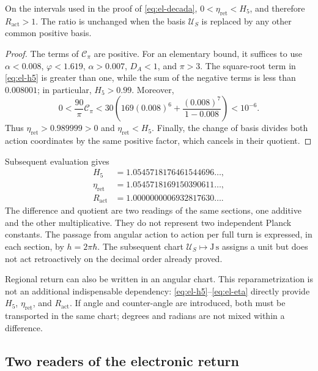 \begin{proposition}
On the intervals used in the proof of \eqref{eq:el-decada},
\(0<\eta_{\mathrm{ret}}<H_5\), and therefore
\(R_{\mathrm{act}}>1\). The ratio is unchanged when the basis
\(\mathcal U_S\) is replaced by any other common positive basis.
\end{proposition}
\begin{proof}
The terms of \(\mathcal C_\pi\) are positive. For an elementary
bound, it suffices to use \(\alpha<0.008\), \(\varphi<1.619\),
\(\alpha>0.007\), \(D_A<1\), and \(\pi>3\). The square-root term in
\eqref{eq:el-h5} is greater than one, while the sum of the negative
terms is less than \(0.008001\); in particular, \(H_5>0.99\).
Moreover,
\[
 0<\frac{90}{\pi}\mathcal C_\pi
 <30\left(169(0.008)^6+
           \frac{(0.008)^7}{1-0.008}\right)<10^{-6}.
\]
Thus \(\eta_{\mathrm{ret}}>0.989999>0\) and
\(\eta_{\mathrm{ret}}<H_5\). Finally, the change of basis divides
both action coordinates by the same positive factor, which cancels in
their quotient.
\end{proof}

Subsequent evaluation gives
\begin{align*}
 H_5&=1.0545718176461544696\ldots,\\
 \eta_{\mathrm{ret}}&=1.0545718169150390611\ldots,\\
 R_{\mathrm{act}}&=1.0000000006932817630\ldots.
\end{align*}
The difference and quotient are two readings of the same sections,
one additive and the other multiplicative. They do not represent two independent
Planck constants. The passage from angular action to action per full
turn is expressed, in each section, by
\(h=2\pi\hbar\). The subsequent chart
\(\mathcal U_S\mapsto\mathrm{J\,s}\) assigns a unit but does not
act retroactively on the decimal order already proved.

Regional return can also be written in an angular chart.
This reparametrization is not an additional indispensable dependency:
\eqref{eq:el-h5}--\eqref{eq:el-eta} directly provide
\(H_5\), \(\eta_{\mathrm{ret}}\), and \(R_{\mathrm{act}}\). If
angle and counter-angle are introduced, both must be transported in the same
chart; degrees and radians are not mixed within a difference.




\subsection{Two readers of the electronic return}

